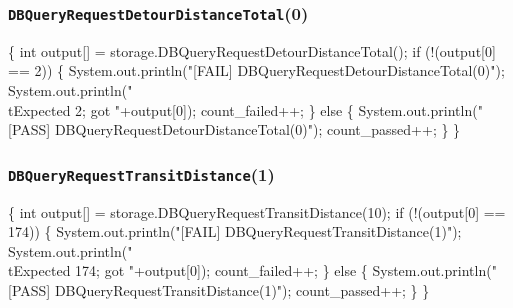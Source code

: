 \documentclass{article}
\def\nwendcode{\endtrivlist \endgroup}
\let\nwdocspar=\par
\begin{document}
\subsubsection{{\tt{}DBQueryRequestDetourDistanceTotal}(0)}
\nwenddocs{}\endmoddef{}
\{
  int output[] = storage.DBQueryRequestDetourDistanceTotal();
  if (!(output[0] == 2)) \{
    System.out.println("[FAIL] DBQueryRequestDetourDistanceTotal(0)");
    System.out.println("\\tExpected 2; got "+output[0]);
    count_failed++;
  \} else \{
    System.out.println("[PASS] DBQueryRequestDetourDistanceTotal(0)");
    count_passed++;
  \}
\}
\nwendcode{}\nwdocspar
\subsubsection{{\tt{}DBQueryRequestTransitDistance}(1)}
\nwenddocs{}\endmoddef{}
\{
  int output[] = storage.DBQueryRequestTransitDistance(10);
  if (!(output[0] == 174)) \{
    System.out.println("[FAIL] DBQueryRequestTransitDistance(1)");
    System.out.println("\\tExpected 174; got "+output[0]);
    count_failed++;
  \} else \{
    System.out.println("[PASS] DBQueryRequestTransitDistance(1)");
    count_passed++;
  \}
\}
\nwendcode{}\nwdocspar
\end{document}
